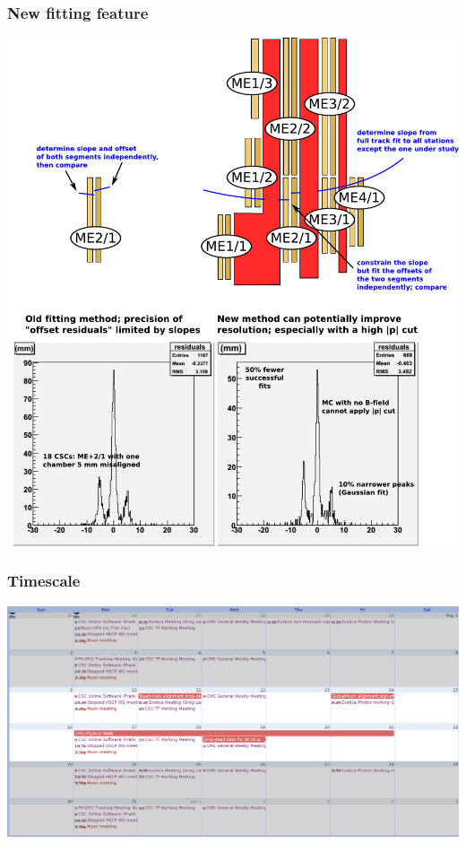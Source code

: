 \documentclass[compress]{beamer}
\begin{document}

\begin{frame}
\frametitle{New fitting feature}
\vspace{-1 cm}
\includegraphics[width=0.8\linewidth]{new_fitting_method.pdf}
\end{frame}

\begin{frame}
\frametitle{Timescale}
\includegraphics[width=\linewidth]{may_calendar.png}
\label{numpages}
\end{frame}
\end{document}
